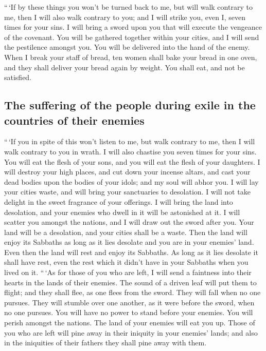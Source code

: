  ``\,`If by these things you won't be turned back to me,
but will walk contrary to me,  then I will also walk
contrary to you; and I will strike you, even I, seven times for your
sins.  I will bring a sword upon you that will execute
the vengeance of the covenant. You will be gathered together within your
cities, and I will send the pestilence amongst you. You will be
delivered into the hand of the enemy.  When I break your
staff of bread, ten women shall bake your bread in one oven, and they
shall deliver your bread again by weight. You shall eat, and not be
satisfied.

\hypertarget{the-suffering-of-the-people-during-exile-in-the-countries-of-their-enemies}{%
\subsection{The suffering of the people during exile in the countries of
their
enemies}\label{the-suffering-of-the-people-during-exile-in-the-countries-of-their-enemies}}

 ``\,`If you in spite of this won't listen to me, but
walk contrary to me,  then I will walk contrary to you in
wrath. I will also chastise you seven times for your sins.
 You will eat the flesh of your sons, and you will eat
the flesh of your daughters.  I will destroy your high
places, and cut down your incense altars, and cast your dead bodies upon
the bodies of your idols; and my soul will abhor you.  I
will lay your cities waste, and will bring your sanctuaries to
desolation. I will not take delight in the sweet fragrance of your
offerings.  I will bring the land into desolation, and
your enemies who dwell in it will be astonished at it.  I
will scatter you amongst the nations, and I will draw out the sword
after you. Your land will be a desolation, and your cities shall be a
waste.  Then the land will enjoy its Sabbaths as long as
it lies desolate and you are in your enemies' land. Even then the land
will rest and enjoy its Sabbaths.  As long as it lies
desolate it shall have rest, even the rest which it didn't have in your
Sabbaths when you lived on it.  ``\,`As for those of you
who are left, I will send a faintness into their hearts in the lands of
their enemies. The sound of a driven leaf will put them to flight; and
they shall flee, as one flees from the sword. They will fall when no one
pursues.  They will stumble over one another, as it were
before the sword, when no one pursues. You will have no power to stand
before your enemies.  You will perish amongst the
nations. The land of your enemies will eat you up.  Those
of you who are left will pine away in their iniquity in your enemies'
lands; and also in the iniquities of their fathers they shall pine away
with them.

